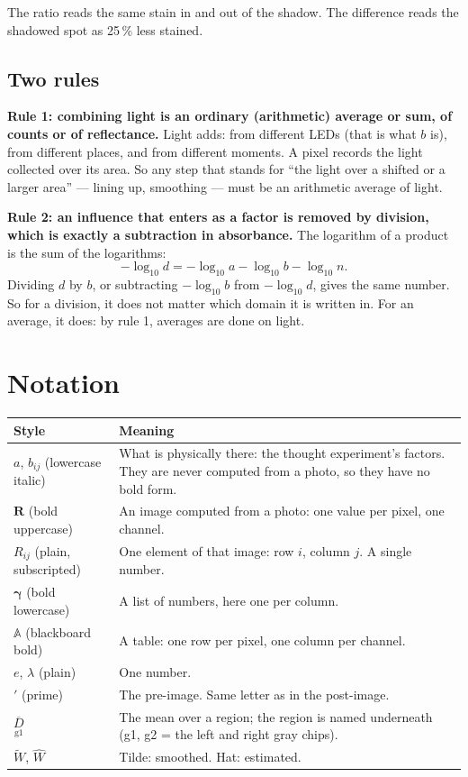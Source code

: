 \documentclass[11pt,letter]{article}
\newcommand{\iR}{\mathbf{R}}   %
\newcommand{\tblA}{\mathbb{A}} %
\newcommand{\vgamma}{\bm{\gamma}}
\newcommand{\reg}[2]{\underset{\text{#1}}{#2}}
\newcommand{\avg}[2]{\overline{\reg{#1}{#2}}}
\newcommand{\Lten}{\log_{10}}
\begin{document}
\noindent The ratio reads the same stain in and out of the shadow.  The
difference reads the shadowed spot as 25\,\% less stained.

\subsection{Two rules}
\label{sec:rules}

\textbf{Rule 1: combining light is an ordinary (arithmetic) average or sum,
of counts or of reflectance.}  Light adds: from different LEDs (that is
what $b$ is), from different places, and from different moments.  A pixel
records the light collected over its area.  So any step that stands for
``the light over a shifted or a larger area'' --- lining up, smoothing ---
must be an arithmetic average of light.

\textbf{Rule 2: an influence that enters as a factor is removed by
division, which is exactly a subtraction in absorbance.}  The logarithm of
a product is the sum of the logarithms:
\begin{equation}
  -\Lten d = -\Lten a - \Lten b - \Lten n .
  \label{eq:log}
\end{equation}
Dividing $d$ by $b$, or subtracting $-\Lten b$ from $-\Lten d$, gives the
same number.  So for a division, it does not matter which domain it is
written in.  For an average, it does: by rule 1, averages are done on light.

\section{Notation}
\label{sec:notation}

\begin{tabular}{@{}L{3.4cm}L{11.4cm}@{}}
\toprule
Style & Meaning \\
\midrule
$a$, $b_{ij}$ (lowercase italic) & What is physically there: the
  thought experiment's factors.  They are never computed from a photo, so
  they have no bold form. \\
$\iR$ (bold uppercase) & An image computed from a photo: one value per
  pixel, one channel. \\
$R_{ij}$ (plain, subscripted) & One element of that image: row $i$,
  column $j$.  A single number. \\
$\vgamma$ (bold lowercase) & A list of numbers, here one per column. \\
$\tblA$ (blackboard bold) & A table: one row per pixel, one column per
  channel. \\
$e$, $\lambda$ (plain) & One number. \\
$'$ (prime) & The pre-image.  Same letter as in the post-image. \\
$\avg{g1}{D}$ & The mean over a region; the region is named underneath
  (g1, g2 = the left and right gray chips). \\
$\widetilde W$, $\widehat W$ & Tilde: smoothed.  Hat: estimated. \\
\bottomrule
\end{tabular}
\end{document}
